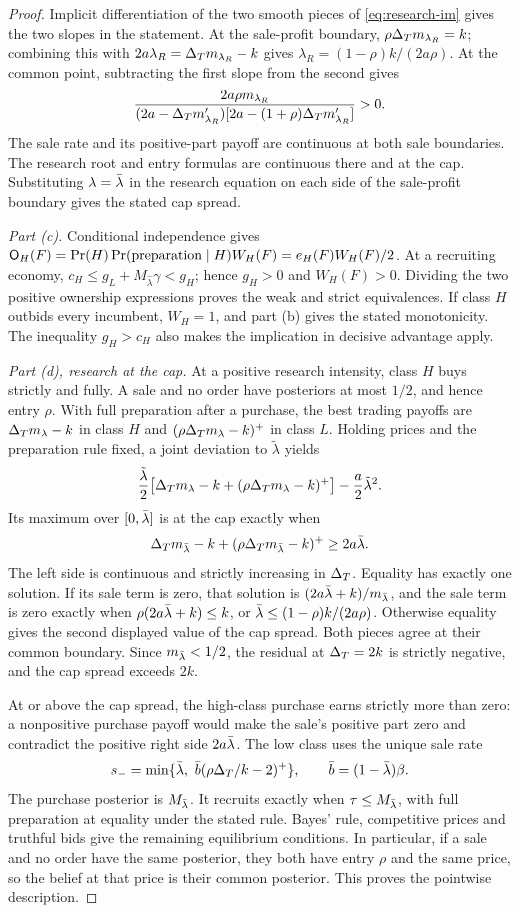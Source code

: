 \begin{proof}
Implicit differentiation of the two smooth pieces of \eqref{eq:research-im} gives the two slopes in the
statement. At the sale-profit boundary, \(\rho\Delta_T m_{\lambda_R}=k\); combining this with
\(2a\lambda_R=\Delta_T m_{\lambda_R}-k\) gives \(\lambda_R=(1-\rho)k/(2a\rho)\).
At the common point, subtracting the first slope from the second gives
\[
 \frac{2a\rho m_{\lambda_R}}
 {(2a-\Delta_T m'_{\lambda_R})[2a-(1+\rho)\Delta_T m'_{\lambda_R}]}>0.
\]
The sale rate and its positive-part payoff are continuous at both sale boundaries. The research root and
entry formulas are continuous there and at the cap. Substituting \(\lambda=\bar\lambda\) in the research equation
on each side of the sale-profit boundary gives the stated cap spread.

\emph{Part (c).} Conditional independence gives
\(\mathsf{O}_H(F)=\Pr(H)\Pr(\text{preparation}\mid H)W_H(F)=e_H(F)W_H(F)/2\).
At a recruiting economy, \(c_H\le g_L+M_{\hat\lambda}\gamma<g_H\); hence \(g_H>0\) and \(W_H(F)>0\).
Dividing the two positive ownership expressions proves the weak and strict equivalences.
If class \(H\) outbids every incumbent, \(W_H=1\), and part (b) gives the stated monotonicity.
The inequality \(g_H>c_H\) also makes the implication in decisive advantage apply.

\emph{Part (d), research at the cap.}
At a positive research intensity, class \(H\) buys strictly and fully. A sale and no order have posteriors at most
\(1/2\), and hence entry \(\rho\). With full preparation after a purchase, the best trading payoffs are
\(\Delta_T m_\lambda-k\) in class \(H\) and \((\rho\Delta_T m_\lambda-k)^+\) in class \(L\). Holding prices and the
preparation rule fixed, a joint deviation to \(\tilde\lambda\) yields
\[
\frac{\tilde\lambda}{2}
 \bigl[\Delta_T m_\lambda-k+(\rho\Delta_T m_\lambda-k)^+\bigr]
 -\frac a2\tilde\lambda^2.
\]
Its maximum over \([0,\bar\lambda]\) is at the cap exactly when
\[
\Delta_T m_{\bar\lambda}-k+(\rho\Delta_T m_{\bar\lambda}-k)^+\ge2a\bar\lambda.
\]
The left side is continuous and strictly increasing in \(\Delta_T\). Equality has exactly one solution. If its sale
term is zero, that solution is \((2a\bar\lambda+k)/m_{\bar\lambda}\), and the sale term is zero exactly when
\(\rho(2a\bar\lambda+k)\le k\), or \(\bar\lambda\le(1-\rho)k/(2a\rho)\). Otherwise equality gives the second displayed value
of the cap spread. Both pieces agree at their common boundary. Since \(m_{\bar\lambda}<1/2\), the residual at
\(\Delta_T=2k\) is strictly negative, and the cap spread exceeds \(2k\).

At or above the cap spread, the high-class purchase earns strictly more than zero: a nonpositive purchase payoff
would make the sale's positive part zero and contradict the positive right side \(2a\bar\lambda\). The low class uses
the unique sale rate
\[
 s_-=\min\{\bar\lambda,\ \bar b(\rho\Delta_T/k-2)^+\},\qquad \bar b=(1-\bar\lambda)\beta.
\]
The purchase posterior is \(M_{\bar\lambda}\). It recruits exactly when \(\tau\le M_{\bar\lambda}\), with full preparation at
equality under the stated rule. Bayes' rule, competitive prices and truthful bids give the remaining equilibrium
conditions. In particular, if a sale and no order have the same posterior, they both have entry \(\rho\) and the
same price, so the belief at that price is their common posterior. This proves the pointwise description.


\end{proof}
